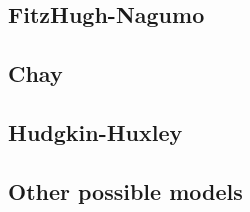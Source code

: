 \documentclass[../../Orator]{subfiles}
\begin{document}
\subsection{FitzHugh-Nagumo}

\subsection{Chay}

\subsection{Hudgkin-Huxley}

\subsection{Other possible models}
\end{document}
